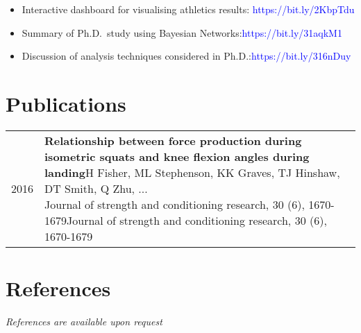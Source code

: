 \documentclass[10pt,a4paper,]{article}
\makeatletter
\providecommand{\tightlist}{%
  \setlength{\itemsep}{0pt}\setlength{\parskip}{0pt}}
\def\detaileditem#1#2#3#4#5{
#2 & \parbox[t]{0.85\textwidth}{%
      \textbf{#1}\hfill{\footnotesize #3}\\
      \ifx#4\empty\else#4\par\fi%
      \ifx#5\empty\else{%
        \vspace{0.1cm}\begin{minipage}{0.7\textwidth}%
        \begin{itemize}#5\end{itemize}%
        \end{minipage}}\fi%
      \vspace{\parsep}}\\}
\def\detailedsection#1{\begin{longtable}{@{\extracolsep{\fill}}ll}#1\end{longtable}}
\makeatother
\begin{document}
\begin{itemize}
\tightlist
\item
  Interactive dashboard for visualising athletics results: \textcolor{blue}{https://bit.ly/2KbpTdu}
\item
  Summary of Ph.D.~study using Bayesian Networks:\textcolor{blue}{https://bit.ly/31aqkM1}
\item
  Discussion of analysis techniques considered in Ph.D.:\textcolor{blue}{https://bit.ly/316nDuy}
\end{itemize}

\hypertarget{publications}{%
\section{Publications}\label{publications}}

\detailedsection{\detaileditem{Relationship between force production during isometric squats and knee flexion angles during landing}{2016}{H Fisher, ML Stephenson, KK Graves, TJ Hinshaw, DT Smith, Q Zhu, ...}{Journal of strength and conditioning research, 30 (6), 1670-1679}{\empty}}

\hypertarget{references}{%
\section{References}\label{references}}

\emph{References are available upon request}
\end{document}
